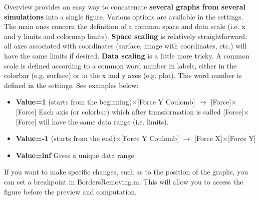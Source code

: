 \documentclass{article}
\begin{document}
Overview provides an easy way to concatenate \textbf{several graphs from several simulations} into a single figure. Various options are available in the settings. The main ones concern the definition of a common space and data scale (i.e. x and y limits and colormap limits). \textbf{Space scaling} is relatively straightforward: all axes associated with coordinates (surface, image with coordinates, etc.) will have the same limits if desired. \textbf{Data scaling} is a little more tricky. A common scale is defined according to a common word number in labels, either in the colorbar (e.g. surface) or in the x and y axes (e.g. plot). This word number is defined in the settings. See examples below:
\begin{itemize}
\item \textbf{Value=1} (starts from the beginning)$\times$[Force Y Coulomb] $\rightarrow$ [Force]$\times$[Force]\newline
Each axis (or colorbar) which after transformation is called [Force]$\times$[Force] will have the same data range (i.e. limits).
\item \textbf{Value=-1} (starts from the end)$\times$[Force Y Coulomb] $\rightarrow$ [Force X]$\times$[Force Y]
\item \textbf{Value=inf}\newline
Gives a unique data range
\end{itemize}

If you want to make specific changes, such as to the position of the graphs, you can set a breakpoint in BordersRemoving.m. This will allow you to access the figure before the preview and computation. 
\end{document}
